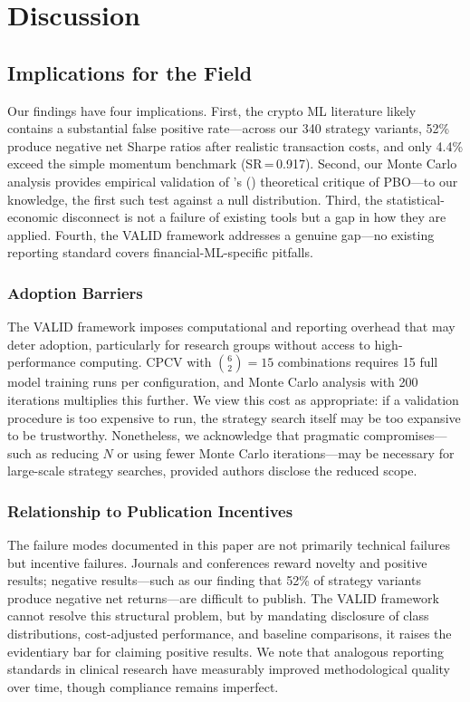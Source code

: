\documentclass[preprint,12pt,authoryear]{elsarticle}
\begin{document}
\section{Discussion}
\label{sec:discussion}

\subsection{Implications for the Field}

Our findings have four implications. First, the crypto ML literature likely contains a substantial false positive rate---across our 340 strategy variants, 52\% produce negative net Sharpe ratios after realistic transaction costs, and only 4.4\% exceed the simple momentum benchmark (SR\,=\,0.917). Second, our Monte Carlo analysis provides empirical validation of \citeauthor{witzany2021bayesian}'s (\citeyear{witzany2021bayesian}) theoretical critique of PBO---to our knowledge, the first such test against a null distribution. Third, the statistical-economic disconnect is not a failure of existing tools but a gap in how they are applied. Fourth, the VALID framework addresses a genuine gap---no existing reporting standard covers financial-ML-specific pitfalls.

\subsubsection{Adoption Barriers}
The VALID framework imposes computational and reporting overhead that may deter adoption, particularly for research groups without access to high-performance computing. CPCV with $\binom{6}{2} = 15$ combinations requires 15 full model training runs per configuration, and Monte Carlo analysis with 200 iterations multiplies this further. We view this cost as appropriate: if a validation procedure is too expensive to run, the strategy search itself may be too expansive to be trustworthy. Nonetheless, we acknowledge that pragmatic compromises---such as reducing $N$ or using fewer Monte Carlo iterations---may be necessary for large-scale strategy searches, provided authors disclose the reduced scope.

\subsubsection{Relationship to Publication Incentives}
The failure modes documented in this paper are not primarily technical failures but incentive failures. Journals and conferences reward novelty and positive results; negative results---such as our finding that 52\% of strategy variants produce negative net returns---are difficult to publish. The VALID framework cannot resolve this structural problem, but by mandating disclosure of class distributions, cost-adjusted performance, and baseline comparisons, it raises the evidentiary bar for claiming positive results. We note that analogous reporting standards in clinical research \citep[CONSORT;][]{moher2010consort,collins2015tripod} have measurably improved methodological quality over time, though compliance remains imperfect.
\end{document}
